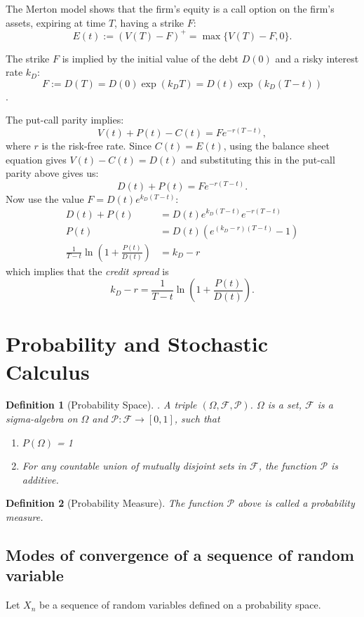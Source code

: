 \documentclass{amsart}
\theoremstyle{plain}
\newtheorem{definition}{Definition}
\numberwithin{equation}{section}
\begin{document}
The Merton model shows that the firm's equity is 
a call option on the firm's assets, expiring at 
time $T$, having a strike $F$:
$$E(t)  := \left(V(T) - F\right)^{+}= \max\{V(T)-F,0\}.$$

The strike $F$ is implied by the initial value of the 
debt $D(0)$ and a risky interest rate $k_D$:
$$F := D(T) = D(0)\exp(k_DT) = D(t)\exp(k_D(T-t))$$.

The put-call parity implies:
$$V(t) + P(t) - C(t) = F e^{-r(T-t)},$$
where $r$ is the risk-free rate.
Since $C(t) = E(t)$, using the balance 
sheet equation gives $V(t)-C(t)=D(t)$ and 
substituting this in the put-call parity 
above gives us:
$$D(t) + P(t) = F e^{-r(T-t)}.$$
Now use the value $F = D(t) e^{k_D(T-t)}$:
\begin{align*}
D(t) + P(t) &= D(t) e^{k_D(T-t)} e^{-r(T-t)}\\
P(t) &= D(t)\left(e^{(k_D-r)(T-t)} - 1\right)\\
\frac{1}{T-t}\ln\left(1+\frac{P(t)}{D(t)}\right) &= k_D-r
\end{align*}
which implies that the \emph{credit spread} 
is 
$$k_D - r = \frac{1}{T-t}\ln\left(1+\frac{P(t)}{D(t)}\right).$$

\section{Probability and Stochastic Calculus}

\begin{definition}[Probability Space]. 
A triple $(\Omega, \mathcal{F}, \mathcal{P})$.
$\Omega$ is a set, $\mathcal{F}$ is a sigma-algebra
on $\Omega$ and $\mathcal{P}: \mathcal{F} \to [0, 1]$,
such that 
\begin{enumerate}
	\item $P(\Omega)$ = 1
	\item For any countable union of mutually disjoint sets in $\mathcal{F}$, the 
	function $\mathcal{P}$ is additive.
\end{enumerate}
\end{definition}
\begin{definition}[Probability Measure]
The function $\mathcal{P}$ above is called a probability measure.
\end{definition}

\subsection{Modes of convergence of a sequence of random variable}
Let $X_n$ be a sequence of random variables defined on a probability 
space. 
\end{document}
